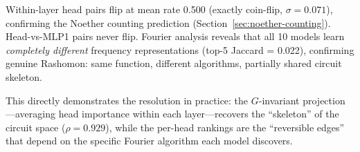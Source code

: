 Within-layer head pairs flip at mean rate 0.500 (exactly coin-flip,
$\sigma = 0.071$), confirming the Noether counting prediction
(Section~\ref{sec:noether-counting}). Head-vs-MLP1 pairs never flip.
Fourier analysis reveals that all 10 models learn \emph{completely
different} frequency representations (top-5 Jaccard = 0.022), confirming
genuine Rashomon: same function, different algorithms, partially shared
circuit skeleton.

This directly demonstrates the resolution in practice: the
$G$-invariant projection---averaging head importance within each
layer---recovers the ``skeleton'' of the circuit space ($\rho = 0.929$),
while the per-head rankings are the ``reversible edges'' that depend on
the specific Fourier algorithm each model discovers.
